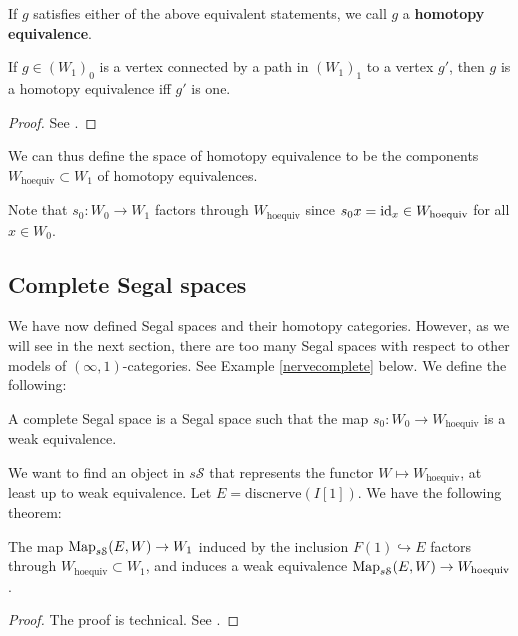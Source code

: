 \begin{refsection}
If $g$ satisfies either of the above equivalent statements, we call $g$ a \textbf{homotopy equivalence}.

\begin{lemma}
If $g\in (W_1)_0$ is a vertex connected by a path in $(W_1)_1$ to a vertex $g'$, then $g$ is a homotopy equivalence iff $g'$ is one.
\end{lemma}
\begin{proof}
See \cite[Lemma 5.8]{rezk}.
\end{proof}

\begin{defin}
We can thus define the space of homotopy equivalence to be the components $W_{\mathrm{hoequiv}}\subset W_1$ of homotopy equivalences.
\end{defin}
Note that $s_0:W_0\to W_1$ factors through $W_{\mathrm{hoequiv}}$ since $s_0x=\mathrm{id}_x\in W_{\mathrm{hoequiv}}$ for all $x\in W_0$.

\subsection{Complete Segal spaces}
We have now defined Segal spaces and their homotopy categories. However, as we will see in the next section, there are too many Segal spaces with respect to other models of $(\infty,1)$-categories. See Example \ref{nervecomplete} below.
We define the following:
\begin{defin}
A complete Segal space is a Segal space such that the map $s_0:W_0\to W_{\mathrm{hoequiv}}$ is a weak equivalence.
\end{defin}

We want to find an object in $s\mathcal S$ that represents the functor $W\mapsto W_{\mathrm{hoequiv}}$, at least up to weak equivalence. Let $E=\mathrm{discnerve}(I[1])$. We have the following theorem:
\begin{thm}\label{rephoequiv}
The map $\operatorname{\mathrm{Map}}_{s\mathcal S}(E,W)\to W_1$ induced by the inclusion $F(1)\hookrightarrow E$ factors through $W_{\mathrm{hoequiv}}\subset W_1$, and induces a weak equivalence $\operatorname{\mathrm{Map}}_{s\mathcal S}(E,W)\to W_{\mathrm{hoequiv}}$.
\end{thm}
\begin{proof}
The proof is technical. See \cite[Thm 6.2]{rezk}.
\end{proof}


\end{refsection}
